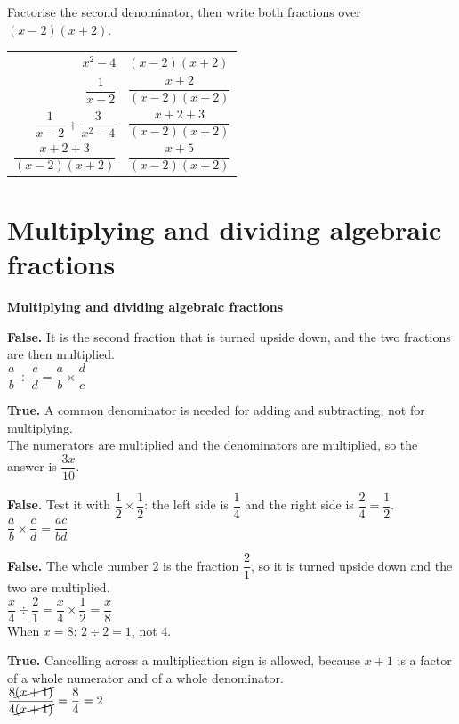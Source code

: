 \documentclass[aspectratio=169]{beamer}
\makeatletter
\newcommand{\qtopic}[1]{%
  \section{#1}%
  \begin{frame}
    \vfill
    \begin{center}
      {\usebeamercolor[fg]{structure}\Huge\bfseries #1}
    \end{center}
    \vfill
  \end{frame}%
}
\newcommand{\work}[1]{%
  \begin{tabular}{@{}r@{\;=\;}l@{}}#1\end{tabular}%
}
\newcommand{\strike}[1]{\cancel{#1}}
\makeatother
\begin{document}
  {Factorise the second denominator, then write both fractions over
   $(x-2)(x+2)$.
   \par\vspace{0.4em}
   \work{$x^{2}-4$ & $(x-2)(x+2)$\\[1.3em]
         $\dfrac{1}{x-2}$ & $\dfrac{x+2}{(x-2)(x+2)}$\\[1.3em]
         $\dfrac{1}{x-2}+\dfrac{3}{x^{2}-4}$ & $\dfrac{x+2+3}{(x-2)(x+2)}$\\[1.3em]
         $\dfrac{x+2+3}{(x-2)(x+2)}$ & $\dfrac{x+5}{(x-2)(x+2)}$}}

\qtopic{Multiplying and dividing algebraic fractions}

  {\textbf{False.} It is the second fraction that is turned upside down,
   and the two fractions are then multiplied.\\[0.3em]
   $\dfrac{a}{b}\div\dfrac{c}{d}=\dfrac{a}{b}\times\dfrac{d}{c}$}

  {\textbf{True.} A common denominator is needed for adding and
   subtracting, not for multiplying.\\[0.3em]
   The numerators are multiplied and the denominators are multiplied, so
   the answer is $\dfrac{3x}{10}$.}

  {\textbf{False.} Test it with $\dfrac{1}{2}\times\dfrac{1}{2}$: the left
   side is $\dfrac{1}{4}$ and the right side is $\dfrac{2}{4}=\dfrac{1}{2}$.\\[0.3em]
   $\dfrac{a}{b}\times\dfrac{c}{d}=\dfrac{ac}{bd}$}

  {\textbf{False.} The whole number $2$ is the fraction $\dfrac{2}{1}$,
   so it is turned upside down and the two are multiplied.\\[0.3em]
   $\dfrac{x}{4}\div\dfrac{2}{1}=\dfrac{x}{4}\times\dfrac{1}{2}=\dfrac{x}{8}$\\[0.3em]
   When $x=8$: $2\div 2=1$, not $4$.}

  {\textbf{True.} Cancelling across a multiplication sign is allowed,
   because $x+1$ is a factor of a whole numerator and of a whole
   denominator.\\[0.3em]
   $\dfrac{8\strike{(x+1)}}{4\strike{(x+1)}}=\dfrac{8}{4}=2$}
\end{document}
